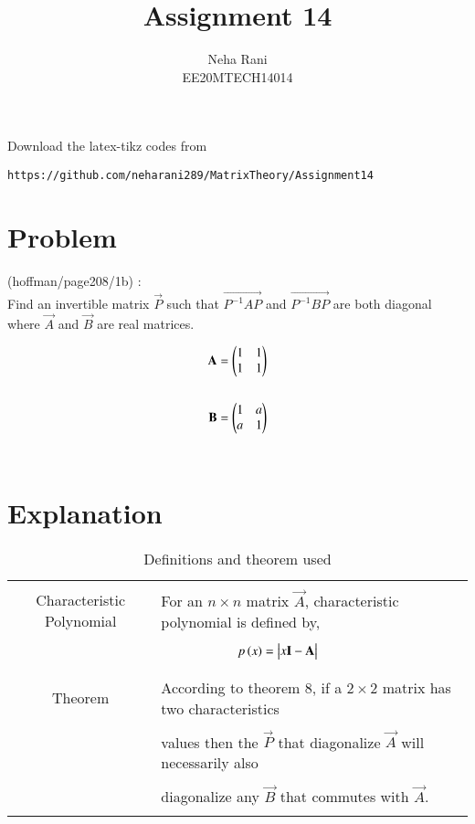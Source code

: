 \documentclass[journal,12pt]{IEEEtran}
\begin{document}
     \def\rightbox#1{\makebox[0in][r]{#1}}
     \def\centbox#1{\makebox[0in]{#1}}
     \def\topbox#1{\raisebox{-\baselineskip}[0in][0in]{#1}}
     \def\midbox#1{\raisebox{-0.5\baselineskip}[0in][0in]{#1}}
\vspace{3cm}
\title{Assignment 14}
\author{Neha Rani\\EE20MTECH14014}
\maketitle
\bigskip
\renewcommand{\thefigure}{\theenumi}
\renewcommand{\thetable}{\theenumi}
%
Download the latex-tikz codes from 
%
\begin{lstlisting}
https://github.com/neharani289/MatrixTheory/Assignment14
\end{lstlisting}
\section{\textbf{Problem}}
(hoffman/page208/1b) : \\
%
Find an invertible matrix $\vec{P}$ such that $\vec{P^{-1}AP}$ and $\vec{P^{-1}BP}$ are both diagonal where $\vec{A}$ and $\vec{B}$ are real matrices.

\begin{align}
    \Vec{A}=\myvec{1&1\\1&1}\\ 
   \nonumber \\ 
    \vec{B}=\myvec{1&a\\a&1}
\end{align}
\bigskip\\
\section{\textbf{Explanation}}
\renewcommand{\thetable}{1}
\begin{table}[ht!]
\centering
\begin{tabular}{|c|l|}
    \hline
	\multirow{3}{*}{Characteristic Polynomial} 
	& \\
	& For an $n\times n$ matrix $\vec{A}$, characteristic polynomial is defined by,\\
	&\\
	& $\qquad\qquad\qquad p\brak{x}=\mydet{x\Vec{I}-\Vec{A}}$\\
	&\\
	\hline
	\multirow{3}{*}{Theorem}
    &\\
    & According  to theorem 8, if a $2\times 2$ matrix has two characteristics \\
    &\\
    & values then the $\vec{P}$ that diagonalize $\vec{A}$ will
    necessarily also   \\
    &\\
    & diagonalize any $\vec{B}$ that commutes with $\vec{A}$. \\
    &\\
    \hline
\end{tabular}
\label{table:1}
    \caption{Definitions and theorem used}
\end{table}
\newpage
\end{document}
